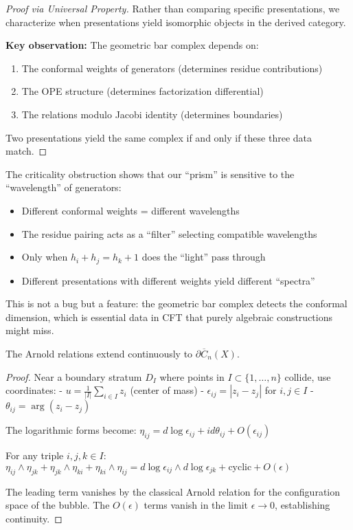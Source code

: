    \begin{proof}[Proof via Universal Property]
   Rather than comparing specific presentations, we characterize when presentations yield isomorphic 
   objects in the derived category.
   
   \textbf{Key observation:} The geometric bar complex depends on:
   \begin{enumerate}
   \item The conformal weights of generators (determines residue contributions)
   \item The OPE structure (determines factorization differential)  
   \item The relations modulo Jacobi identity (determines boundaries)
   \end{enumerate}
   
   Two presentations yield the same complex if and only if these three data match.
   \end{proof}
   
   \begin{remark}
   The criticality obstruction shows that our ``prism'' is sensitive to the ``wavelength'' of generators:
   \begin{itemize}
   \item Different conformal weights = different wavelengths
   \item The residue pairing acts as a ``filter'' selecting compatible wavelengths
   \item Only when $h_i + h_j = h_k + 1$ does the ``light'' pass through
   \item Different presentations with different weights yield different ``spectra''
   \end{itemize}
   
   This is not a bug but a feature: the geometric bar complex detects the conformal dimension, which is 
   essential data in CFT that purely algebraic constructions might miss.
   \end{remark}
   
\begin{lemma}\label{lem:arnold-boundary}
The Arnold relations extend continuously to $\partial \overline{C}_n(X)$.
\end{lemma}

\begin{proof}
Near a boundary stratum $D_I$ where points in $I \subset \{1,\ldots,n\}$ collide, use coordinates:
- $u = \frac{1}{|I|}\sum_{i \in I} z_i$ (center of mass)
- $\epsilon_{ij} = |z_i - z_j|$ for $i,j \in I$
- $\theta_{ij} = \arg(z_i - z_j)$

The logarithmic forms become:
$\eta_{ij} = d\log \epsilon_{ij} + id\theta_{ij} + O(\epsilon_{ij})$

For any triple $i,j,k \in I$:
$\eta_{ij} \wedge \eta_{jk} + \eta_{jk} \wedge \eta_{ki} + \eta_{ki} \wedge \eta_{ij} = d\log \epsilon_{ij} \wedge d\log \epsilon_{jk} + \text{cyclic} + O(\epsilon)$

The leading term vanishes by the classical Arnold relation for the configuration space of the bubble. The $O(\epsilon)$ terms vanish in the limit $\epsilon \to 0$, establishing continuity.
\end{proof}

